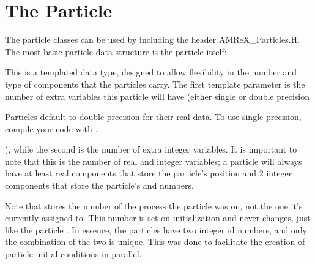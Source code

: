 \documentclass[letterpaper,10pt,english]{sphinxmanual}
\begin{document}
\section{The Particle}
\label{\detokenize{Particle:the-particle}}\label{\detokenize{Particle:sec-particles-particle}}\label{\detokenize{Particle::doc}}
\sphinxAtStartPar
The particle classes can be used by including the header AMReX\_Particles.H. The
most basic particle data structure is the particle itself:

\begin{sphinxVerbatim}[commandchars=\\\{\}]
  
\end{sphinxVerbatim}

\sphinxAtStartPar
This is a templated data type, designed to allow flexibility in the number and
type of components that the particles carry. The first template parameter is the
number of extra  variables this particle will have (either single or
double precision \sphinxstepexplicit %
\begin{footnote}[1]\label{\thesphinxscope.1}%
\sphinxAtStartFootnote
Particles default to double precision for their real data. To use single precision, compile your code with .
%
\end{footnote}), while the second is the number of extra integer
variables.  It is important to note that this is the number of  real and
integer variables; a particle will always have at least  real
components that store the particle’s position and 2 integer components that
store the particle’s  and  numbers. \sphinxstepexplicit %
\begin{footnote}[2]\label{\thesphinxscope.2}%
\sphinxAtStartFootnote
Note that  stores the number of the process the particle was  on, not the one it’s currently assigned to. This number is set on initialization and never changes, just like the particle . In essence, the particles have two integer id numbers, and only the combination of the two is unique. This was done to facilitate the creation of particle initial conditions in parallel.
%
\end{footnote}
\end{document}
